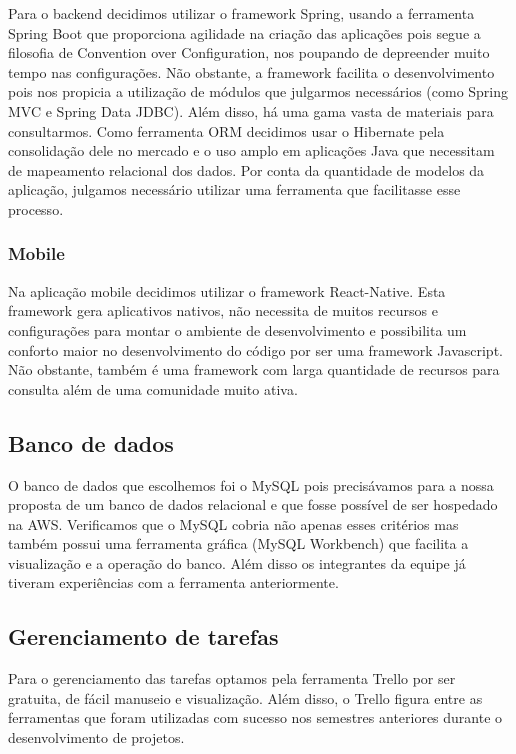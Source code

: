 Para o \gls{backend} decidimos utilizar o \gls{framework} Spring, usando a ferramenta Spring Boot que proporciona agilidade na criação das aplicações pois segue a filosofia de Convention over Configuration\cite{Devopedia2020}, nos poupando de depreender muito tempo nas configurações. Não obstante, a \gls{framework} facilita o desenvolvimento pois nos propicia a utilização de módulos que julgarmos necessários (como Spring MVC e Spring Data JDBC). Além disso, há uma gama vasta de materiais para consultarmos.
Como ferramenta \gls{ORM} decidimos usar o Hibernate pela consolidação dele no mercado e o uso amplo em aplicações Java que necessitam de mapeamento relacional dos dados. Por conta da quantidade de modelos da aplicação, julgamos necessário utilizar uma ferramenta que facilitasse esse processo. 

\subsubsection{Mobile}
Na aplicação mobile decidimos utilizar o \gls{framework} React-Native. Esta \gls{framework} gera aplicativos nativos, não necessita de muitos recursos e configurações para montar o ambiente de desenvolvimento e possibilita um conforto maior no desenvolvimento do código por ser uma \gls{framework} Javascript. Não obstante, também é uma \gls{framework} com larga quantidade de recursos para consulta além de uma comunidade muito ativa.

\subsection{Banco de dados}
O banco de dados que escolhemos foi o MySQL pois precisávamos para a nossa proposta de um banco de dados relacional e que fosse possível de ser hospedado na AWS. Verificamos que o MySQL cobria não apenas esses critérios mas também possui uma ferramenta gráfica (MySQL Workbench) que facilita a visualização e a operação do banco. Além disso os integrantes da equipe já tiveram experiências com a ferramenta anteriormente.

\subsection{Gerenciamento de tarefas}
Para o gerenciamento das tarefas optamos pela ferramenta Trello por ser gratuita, de fácil manuseio e visualização.
Além disso, o Trello figura entre as ferramentas que foram utilizadas com sucesso nos semestres anteriores durante o desenvolvimento de projetos.

